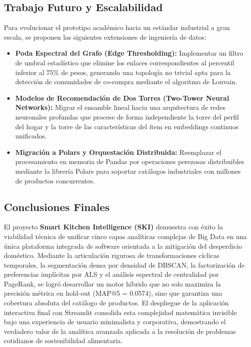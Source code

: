 \documentclass[11pt,a4paper]{article}
\begin{document}
\subsection{Trabajo Futuro y Escalabilidad}
Para evolucionar el prototipo académico hacia un estándar industrial a gran escala, se proponen las siguientes extensiones de ingeniería de datos:
\begin{itemize}
    \item \textbf{Poda Espectral del Grafo (Edge Thresholding):} Implementar un filtro de umbral estadístico que elimine los enlaces correspondientes al percentil inferior al 75\% de pesos, generando una topología no trivial apta para la detección de comunidades de co-compra mediante el algoritmo de Louvain.
    \item \textbf{Modelos de Recomendación de Dos Torres (Two-Tower Neural Networks):} Migrar el ensamble lineal hacia una arquitectura de redes neuronales profundas que procese de forma independiente la torre del perfil del hogar y la torre de las características del ítem en embeddings continuos unificados.
    \item \textbf{Migración a Polars y Orquestación Distribuida:} Reemplazar el procesamiento en memoria de Pandas por operaciones perezosas distribuibles mediante la librería Polars para soportar catálogos industriales con millones de productos concurrentes.
\end{itemize}

\subsection{Conclusiones Finales}
El proyecto \textbf{Smart Kitchen Intelligence (SKI)} demuestra con éxito la viabilidad técnica de unificar cinco capas analíticas complejas de Big Data en una única plataforma integrada de software orientada a la mitigación del desperdicio doméstico. Mediante la articulación rigurosa de transformaciones cíclicas temporales, la segmentación densa por densidad de DBSCAN, la factorización de preferencias implícitas por ALS y el análisis espectral de centralidad por PageRank, se logró desarrollar un motor híbrido que no solo maximiza la precisión métrica en hold-out (MAP@5 = 0.0574), sino que garantiza una cobertura absoluta del catálogo de productos. El despliegue de la aplicación interactiva final con Streamlit consolida esta complejidad matemática invisible bajo una experiencia de usuario minimalista y corporativa, demostrando el verdadero valor de la analítica avanzada aplicada a la resolución de problemas cotidianos de sostenibilidad alimentaria.
\end{document}

